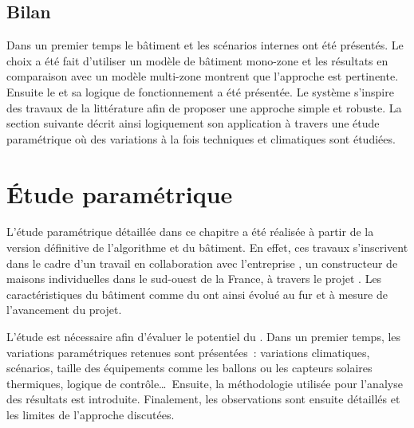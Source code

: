 \subsection{Bilan} %
\label{sub:bilan_cas_etude}
Dans un premier temps le bâtiment et les scénarios internes ont été présentés. Le
choix a été fait d’utiliser un modèle de bâtiment mono-zone et les résultats en
comparaison avec un modèle multi-zone montrent que l’approche est pertinente. Ensuite
le  et sa logique de fonctionnement a été présentée. Le système s’inspire
des travaux de la littérature afin de proposer une approche simple et robuste.
La section suivante décrit ainsi logiquement son application à travers une étude
paramétrique où des variations à la fois techniques et climatiques sont étudiées.







\section{Étude paramétrique} %
\label{sec:etude_parametrique}
L’étude paramétrique détaillée dans ce chapitre a été réalisée à partir de la version
définitive de l’algorithme et du bâtiment. En effet, ces travaux s’inscrivent dans le
cadre d’un travail en collaboration avec l’entreprise , un constructeur de
maisons individuelles dans le sud-ouest de la France, à travers le projet
. Les caractéristiques du bâtiment comme du  ont ainsi évolué
au fur et à mesure de l’avancement du projet.

L’étude est nécessaire afin d’évaluer le potentiel du . Dans un premier temps,
les variations paramétriques retenues sont présentées~: variations climatiques, scénarios,
taille des équipements comme les ballons ou les capteurs solaires thermiques, logique de
contrôle\dots\ Ensuite, la méthodologie utilisée pour l’analyse des résultats est
introduite. Finalement, les observations sont ensuite détaillés et les limites de
l’approche discutées.


